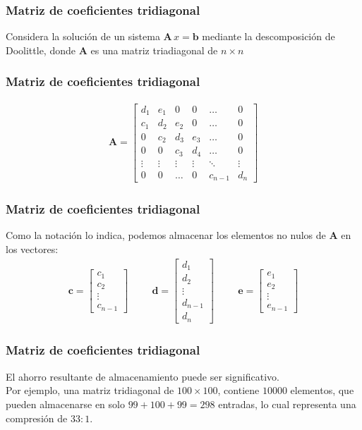 \documentclass[12pt]{beamer}
\begin{document}
\begin{frame}
\frametitle{Matriz de coeficientes tridiagonal}
Considera la solución de un sistema $\mathbf{A} \, x = \mathbf{b}$ mediante la descomposición de Doolittle, donde $\mathbf{A}$ es una matriz triadiagonal de $n\times n$
\end{frame}
\begin{frame}
\frametitle{Matriz de coeficientes tridiagonal}
\renewcommand{\arraystretch}{1}
\begin{align*}
\mathbf{A} =  \begin{bmatrix}
d_{1} & e_{1} & 0 & 0 & \ldots & 0 \\
c_{1} & d_{2} & e_{2} & 0 & \ldots & 0 \\
0 & c_{2} & d_{3} & e_{3} & \ldots & 0 \\
0 & 0 & c_{3}& d_{4} & \ldots & 0 \\
\vdots & \vdots & \vdots & \vdots & \ddots & \vdots \\
0 & 0 & \ldots & 0 & c_{n-1} & d_{n}
\end{bmatrix}
\end{align*}
\end{frame}
\begin{frame}
\frametitle{Matriz de coeficientes tridiagonal}
Como la notación lo indica, podemos almacenar los elementos no nulos de $\mathbf{A}$ en los vectores:
\pause
\renewcommand{\arraystretch}{1}
\begin{align*}
\mathbf{c} = \begin{bmatrix}
c_{1} \\
c_{2} \\
\vdots \\
c_{n-1}
\end{bmatrix}
\hspace{1cm}
\mathbf{d} = \begin{bmatrix}
d_{1} \\
d_{2} \\
\vdots \\
d_{n-1} \\
d_{n}
\end{bmatrix}
\hspace{1cm}
\mathbf{e} = \begin{bmatrix}
e_{1} \\
e_{2} \\
\vdots \\
e_{n-1}
\end{bmatrix}
\end{align*}
\end{frame}
\begin{frame}
\frametitle{Matriz de coeficientes tridiagonal}
El ahorro resultante de almacenamiento puede ser significativo.
\\
\bigskip
\pause
Por ejemplo, una matriz tridiagonal de $100 \times 100$, contiene $10000$ elementos, \pause que pueden almacenarse en solo $99 + 100 + 99 = 298$ entradas, lo cual representa una compresión de $33:1$.
\end{frame} 
\end{document}
